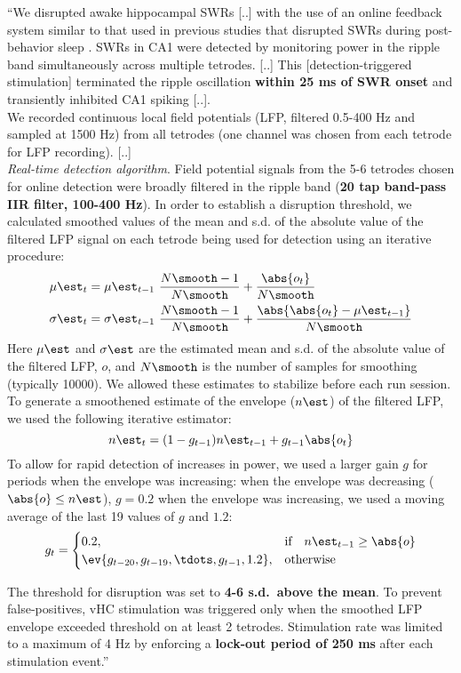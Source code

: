 \begin{quotebar}
``We disrupted awake hippocampal SWRs [..] with the use of an online feedback system similar to that used in previous studies that disrupted SWRs during post-behavior sleep \cite{Girardeau2009,Ego-Stengel2009}. SWRs in CA1 were detected by monitoring power in the ripple band simultaneously across multiple tetrodes. [..] This [detection-triggered stimulation] terminated the ripple oscillation \textbf{within 25 ms of SWR onset} and transiently inhibited CA1 spiking [..].\\
We recorded continuous local field potentials (LFP, filtered 0.5-400 Hz and sampled at 1500 Hz) from all tetrodes (one channel was chosen from each tetrode for LFP recording). [..]\\
\emph{Real-time detection algorithm}. Field potential signals from the 5-6 tetrodes chosen for online detection were broadly filtered in the ripple band (\textbf{20 tap band-pass IIR filter, 100-400 Hz}). In order to establish a disruption threshold, we calculated smoothed values of the mean and s.d. of the absolute value of the filtered LFP signal on each tetrode being used for detection using an iterative procedure:\footnotemark[1]{}
\begin{align*}
\mu\est_t &= \mu\est_{t-1} \ \frac{N\smooth - 1}{N\smooth}
                + \frac{\abs{o_t}}{N\smooth} \\
\sigma\est_t &= \sigma\est_{t-1} \ \frac{N\smooth - 1}{N\smooth}
                + \frac{\abs{\abs{o_t} - \mu\est_{t-1}}}{N\smooth}
\end{align*}
Here $\mu\est$ and $\sigma\est$ are the estimated mean and s.d. of the absolute value of the filtered LFP, $o$, and $N\smooth$ is the  number of samples for smoothing (typically 10000). We allowed these estimates to stabilize before each run session. To generate a smoothened estimate of the envelope ($n\est$) of the filtered LFP, we used the following iterative estimator:\footnotemark[2]{}
\[
n\est_t = (1 - g_{t-1}) n\est_{t-1} + g_{t-1} \abs{o_t}
\]
To allow for rapid detection of increases in power, we used a larger gain $g$ for periods when the envelope was increasing: when the envelope was decreasing ($\abs{o} \le n\est$), $g = 0.2$ when the envelope was increasing, we used a moving average of the last 19 values of $g$ and $1.2$:
\[
g_t = 
\begin{cases}
    0.2,    & \text{if}\quad n\est_{t-1} \geq \abs{o} \\
    \ev{g_{t-20}, g_{t-19}, \tdots, g_{t-1}, 1.2},  & \text{otherwise}
\end{cases}
\]

The threshold for disruption was set to \textbf{4-6 s.d.\ above the mean}. To prevent false-positives, vHC stimulation was triggered only when the smoothed LFP envelope exceeded threshold on at least 2 tetrodes. Stimulation rate was limited to a maximum of 4 Hz by enforcing a \textbf{lock-out period of 250 ms} after each stimulation event.'' \cite{Jadhav2012}
\end{quotebar}


